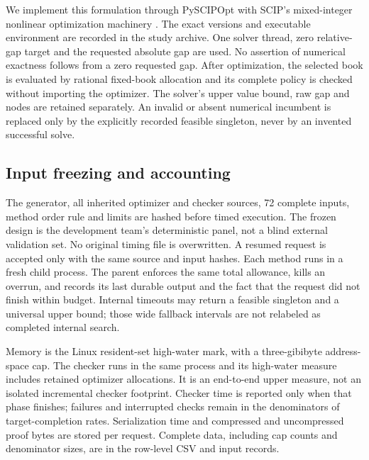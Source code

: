 We implement this formulation through PySCIPOpt \citep{Maher2016} with SCIP's mixed-integer nonlinear optimization machinery \citep{Bolusani2024}. The exact versions and executable environment are recorded in the study archive. One solver thread, zero relative-gap target and the requested absolute gap are used. No assertion of numerical exactness follows from a zero requested gap. After optimization, the selected book is evaluated by rational fixed-book allocation and its complete policy is checked without importing the optimizer. The solver's upper value bound, raw gap and nodes are retained separately. An invalid or absent numerical incumbent is replaced only by the explicitly recorded feasible singleton, never by an invented successful solve.

\subsection{Input freezing and accounting}
The generator, all inherited optimizer and checker sources, 72 complete inputs, method order rule and limits are hashed before timed execution. The frozen design is the development team's deterministic panel, not a blind external validation set. No original timing file is overwritten. A resumed request is accepted only with the same source and input hashes. Each method runs in a fresh child process. The parent enforces the same total allowance, kills an overrun, and records its last durable output and the fact that the request did not finish within budget. Internal timeouts may return a feasible singleton and a universal upper bound; those wide fallback intervals are not relabeled as completed internal search.

Memory is the Linux resident-set high-water mark, with a three-gibibyte address-space cap. The checker runs in the same process and its high-water measure includes retained optimizer allocations. It is an end-to-end upper measure, not an isolated incremental checker footprint. Checker time is reported only when that phase finishes; failures and interrupted checks remain in the denominators of target-completion rates. Serialization time and compressed and uncompressed proof bytes are stored per request. Complete data, including cap counts and denominator sizes, are in the row-level CSV and input records.

